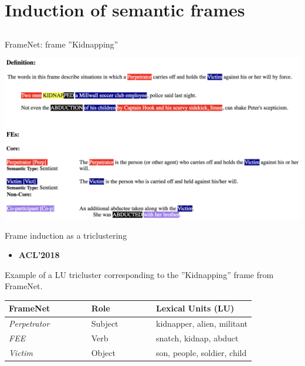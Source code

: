 \section{Induction of semantic frames}

\subsection{}

\begin{frame}{FrameNet: frame ''Kidnapping''}

\begin{center}	
\includegraphics[width=1.0\textwidth]{figures/fn-kidnap}
\end{center}

\end{frame}



\begin{frame}{Frame induction as a triclustering}

\begin{itemize}
\item \textbf{ACL'2018}~\cite{ustalov2018unsupervised}	
\end{itemize}

Example of a LU tricluster corresponding to the ''Kidnapping'' frame from FrameNet.

\begin{table}[t]
\centering
\begin{tabular}{lll}
\textbf{FrameNet~~~~~~~} & \textbf{Role~~~~~~~~} & \textbf{Lexical Units (LU)} \\\toprule
\textit{Perpetrator} & Subject & kidnapper, alien, militant \\ \midrule
\textit{FEE}         & Verb    & snatch, kidnap, abduct \\ \midrule
\textit{Victim}      & Object  & son, people, soldier, child \\
\end{tabular}

\end{table}	

\end{frame}



